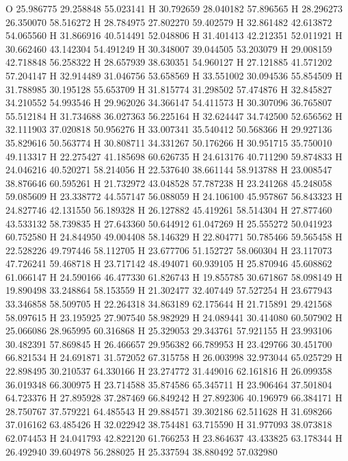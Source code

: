 \documentclass{article}
\begin{document}
O 25.986775 29.258848 55.023141 
H 30.792659 28.040182 57.896565 
H 28.296273 26.350070 58.516272 
H 28.784975 27.802270 59.402579 
H 32.861482 42.613872 54.065560 
H 31.866916 40.514491 52.048806 
H 31.401413 42.212351 52.011921 
H 30.662460 43.142304 54.491249 
H 30.348007 39.044505 53.203079 
H 29.008159 42.718848 56.258322 
H 28.657939 38.630351 54.960127 
H 27.121885 41.571202 57.204147 
H 32.914489 31.046756 53.658569 
H 33.551002 30.094536 55.854509 
H 31.788985 30.195128 55.653709 
H 31.815774 31.298502 57.474876 
H 32.845827 34.210552 54.993546 
H 29.962026 34.366147 54.411573 
H 30.307096 36.765807 55.512184 
H 31.734688 36.027363 56.225164 
H 32.624447 34.742500 52.656562 
H 32.111903 37.020818 50.956276 
H 33.007341 35.540412 50.568366 
H 29.927136 35.829616 50.563774 
H 30.808711 34.331267 50.176266 
H 30.951715 35.750010 49.113317 
H 22.275427 41.185698 60.626735 
H 24.613176 40.711290 59.874833 
H 24.046216 40.520271 58.214056 
H 22.537640 38.661144 58.913788 
H 23.008547 38.876646 60.595261 
H 21.732972 43.048528 57.787238 
H 23.241268 45.248058 59.085609 
H 23.338772 44.557147 56.088059 
H 24.106100 45.957867 56.843323 
H 24.827746 42.131550 56.189328 
H 26.127882 45.419261 58.514304 
H 27.877460 43.533132 58.739835 
H 27.643360 50.644912 61.047269 
H 25.555272 50.041923 60.752580 
H 24.844950 49.004408 58.146329 
H 22.804771 50.785466 59.565458 
H 22.528226 49.797446 58.112705 
H 23.677706 51.152727 58.060304 
H 23.117073 47.726241 59.468718 
H 23.717142 48.494071 60.939105 
H 25.870946 45.608862 61.066147 
H 24.590166 46.477330 61.826743 
H 19.855785 30.671867 58.098149 
H 19.890498 33.248864 58.153559 
H 21.302477 32.407449 57.527254 
H 23.677943 33.346858 58.509705 
H 22.264318 34.863189 62.175644 
H 21.715891 29.421568 58.097615 
H 23.195925 27.907540 58.982929 
H 24.089441 30.414080 60.507902 
H 25.066086 28.965995 60.316868 
H 25.329053 29.343761 57.921155 
H 23.993106 30.482391 57.869845 
H 26.466657 29.956382 66.789953 
H 23.429766 30.451700 66.821534 
H 24.691871 31.572052 67.315758 
H 26.003998 32.973044 65.025729 
H 22.898495 30.210537 64.330166 
H 23.274772 31.449016 62.161816 
H 26.099358 36.019348 66.300975 
H 23.714588 35.874586 65.345711 
H 23.906464 37.501804 64.723376 
H 27.895928 37.287469 66.849242 
H 27.892306 40.196979 66.384171 
H 28.750767 37.579221 64.485543 
H 29.884571 39.302186 62.511628 
H 31.698266 37.016162 63.485426 
H 32.022942 38.754481 63.715590 
H 31.977093 38.073818 62.074453 
H 24.041793 42.822120 61.766253 
H 23.864637 43.433825 63.178344 
H 26.492940 39.604978 56.288025 
H 25.337594 38.880492 57.032980 
\end{document}
